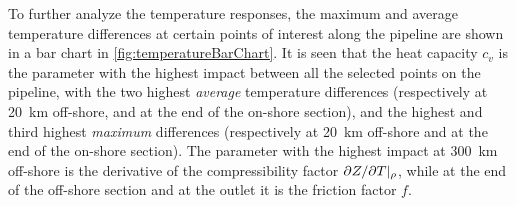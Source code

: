 
To further analyze the temperature responses, the maximum and average temperature differences at certain points of interest along the pipeline are shown in a bar chart in \cref{fig:temperatureBarChart}. %
It is seen that the heat capacity $c_v$ is the parameter with the highest impact between all the selected points on the pipeline, with the two highest \emph{average} temperature differences (respectively at \SI{20}{\kilo\meter} off-shore, and at the end of the on-shore section), and the highest and third highest \emph{maximum} differences (respectively at \SI{20}{\kilo\meter} off-shore and at the end of the on-shore section). The parameter with the highest impact at \SI{300}{\kilo\meter} off-shore is the derivative of the compressibility factor $\partial Z/\partial T\/|_\rho$, while at the end of the off-shore section and at the outlet it is the friction factor $f$.



